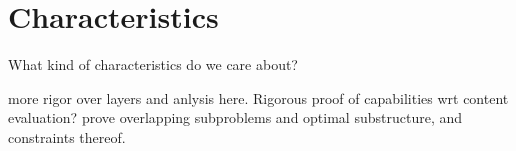 \section{Characteristics}
\label{section:characteristics}
\color{red}
What kind of characteristics do we care about? 

more rigor over layers and anlysis here.  Rigorous proof of capabilities wrt content evaluation? prove overlapping subproblems and optimal substructure, and constraints thereof.
\color{black}